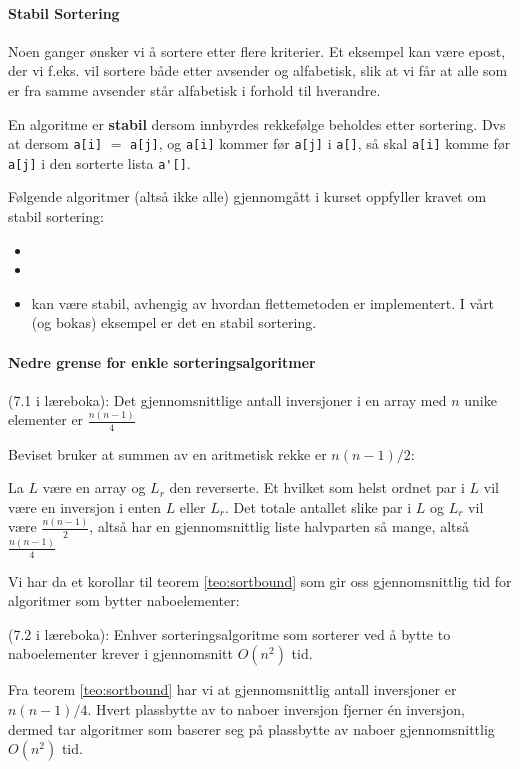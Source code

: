 \paragraph{Stabil Sortering}\label{stabil}
Noen ganger ønsker vi å sortere etter flere kriterier. Et eksempel kan være
epost, der vi f.eks. vil sortere både etter avsender og alfabetisk, slik at vi
får at alle som er fra samme avsender står alfabetisk i forhold til hverandre.

\begin{definisjon}
  En algoritme er \textbf{stabil} dersom innbyrdes rekkefølge beholdes
  etter sortering. Dvs at dersom \verb|a[i]| $ = $ \verb|a[j]|, og \verb|a[i]| kommer før \verb|a[j]| i \verb|a[]|, så skal \verb|a[i]| komme før \verb|a[j]| i den sorterte lista \verb|a'[]|.
\end{definisjon}

Følgende algoritmer (altså ikke alle) gjennomgått i kurset oppfyller kravet om
stabil sortering:
\begin{itemize}
\item {} 
\item {} 
\item {} kan være stabil, avhengig av hvordan flettemetoden er implementert. I vårt (og bokas) eksempel er det en stabil sortering.
\end{itemize}


\paragraph{Nedre grense for enkle sorteringsalgoritmer}
\begin{teorem} (7.1 i læreboka): Det gjennomsnittlige antall inversjoner i en \label{teo:sortbound}
  array med $n$ unike elementer er $\frac{n(n-1)}{4}$
\end{teorem}
Beviset bruker at summen av en aritmetisk rekke er $ n(n-1)/2 $:
\begin{bevis}
  La $L$ være en array og $L_r$ den reverserte. Et hvilket som helst ordnet par
  i $L$ vil være en inversjon i enten $L$ eller $L_r$. Det totale antallet slike
  par i $L$ og $L_r$ vil være $\frac{n(n-1)}{2}$, altså har en gjennomsnittlig
  liste halvparten så mange, altså $\frac{n(n-1)}{4}$ 
\end{bevis}
Vi har da et korollar til teorem \ref{teo:sortbound} som gir oss gjennomsnittlig tid for algoritmer som bytter naboelementer:
\begin{teorem} (7.2 i læreboka): \label{teo:swapkompl}
  Enhver sorteringsalgoritme som sorterer ved å bytte to naboelementer krever i gjennomsnitt $ O(n^2) $ tid.
\end{teorem}
\begin{bevis}
Fra teorem \ref{teo:sortbound} har vi at gjennomsnittlig antall inversjoner er $ n(n-1)/4 $. Hvert plassbytte av to naboer inversjon fjerner én inversjon, dermed tar algoritmer som baserer seg på plassbytte av naboer gjennomsnittlig $ O(n^2) $ tid.
\end{bevis}




